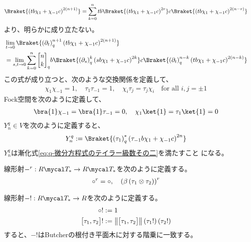 {\begin{todo}[ココマデ]
		\begin{equation*}\begin{split}
			\Braket{\lr{tb\chi_1 + \chi_{-1}c}^{2(n+1)}}
			= \sum_{k=0}^n tb\Braket{\lr{tb\chi_1 + \chi_{-1}c}^{2r}}
				c\Braket{\lr{tb\chi_1 + \chi_{-1}c}^{2(n-r)}}
		\end{split}\end{equation*}
		より、明らかに成り立たない。
		\begin{equation*}\begin{split}
			&\lim_{t\to0} \Braket{\lr{\partial_t}_q^{n+1}
				\lr{tb\chi_1 + \chi_{-1}c}^{2(n+1)}} \\
			&= \lim_{s,t\to0}\sum_{k=0}^n \qbinom{n}{k}_q
				b\Braket{\lr{\partial_s}_q^k
				\lr{sb\chi_1 + \chi_{-1}c}^{2k}}
				c\Braket{\lr{\partial_t}_q^{n-k}
				\lr{tb\chi_1 + \chi_{-1}c}^{2(n-k)}}
		\end{split}\end{equation*}
		この式が成り立つと、次のような交換関係を定義して、
		\begin{equation*}\begin{split}
			\chi_1\chi_{-1} = 1
			,\quad \tau_1\tau_{-1} = 1
			,\quad \chi_i\tau_j = \tau_j\chi_i \quad\text{for all } i,j=\pm1
		\end{split}\end{equation*}
		Fock空間を次のように定義して、
		\begin{equation*}\begin{split}
			\bra{1}\chi_{-1} = \bra{1}\tau_{-1} = 0
			,\quad \chi_{1}\ket{1} = \tau_{1}\ket{1} = 0
		\end{split}\end{equation*}
		$Y^q_n\in V$を次のように定義すると、
		\begin{equation*}\begin{split}
			Y^q_n 
			:= \Braket{\lr{\tau_1}_q^*\lr{\tau_{-1}b\chi_1 + \chi_{-1}c}^{2n}}
		\end{split}\end{equation*}
		$Y^q_n$は漸化式\eqref{eq:q-微分方程式のテイラー級数その二}を満たすこと
		になる。

		線形射$-^r:R\T_*\to R\T_*$を次のように定義する。
		\begin{equation*}\begin{split}
			\circ^r = \circ,\quad \left({\beta\left({\tau_1\otimes\tau_2}\right)}\right)^r
		\end{split}\end{equation*}

		線形射$-!:R\T_*\to R$を次のように定義する。
		\begin{equation*}\begin{split}
			\circ! &:= 1 \\
			\bigl[{\tau_1,\tau_2}\bigr]! &:= \left\lVert{\bigl[{\tau_1,\tau_2}\bigr]}\right\rVert
				\left({\tau_1!}\right)\left({\tau_2!}\right)
		\end{split}\end{equation*}
		すると、$-!$はButcherの根付き平面木に対する階乗に一致する。


\end{todo}}
